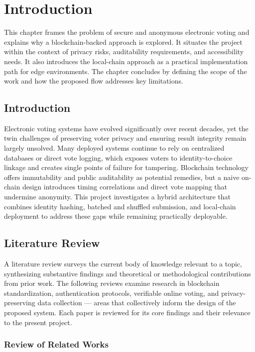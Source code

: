 \chapter{Introduction}

This chapter frames the problem of secure and anonymous electronic voting and explains why a blockchain-backed approach is explored. It situates the project within the context of privacy risks, auditability requirements, and accessibility needs. It also introduces the local-chain approach as a practical implementation path for edge environments. The chapter concludes by defining the scope of the work and how the proposed flow addresses key limitations.

\section[Introduction]{\textbf{Introduction}}
Electronic voting systems have evolved significantly over recent decades, yet the twin challenges of preserving voter privacy and ensuring result integrity remain largely unsolved. Many deployed systems continue to rely on centralized databases or direct vote logging, which exposes voters to identity-to-choice linkage and creates single points of failure for tampering. Blockchain technology offers immutability and public auditability as potential remedies, but a naive on-chain design introduces timing correlations and direct vote mapping that undermine anonymity. This project investigates a hybrid architecture that combines identity hashing, batched and shuffled submission, and local-chain deployment to address these gaps while remaining practically deployable.

\section[Literature Review]{\textbf{Literature Review}}
A literature review surveys the current body of knowledge relevant to a topic, synthesizing substantive findings and theoretical or methodological contributions from prior work. The following reviews examine research in blockchain standardization, authentication protocols, verifiable online voting, and privacy-preserving data collection — areas that collectively inform the design of the proposed system. Each paper is reviewed for its core findings and their relevance to the present project.

\subsection{Review of Related Works}

